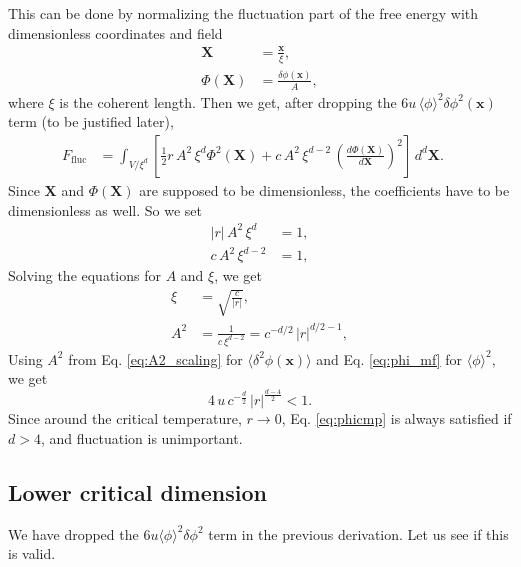 \documentclass{article}
\begin{document}
This can be done by normalizing the fluctuation part of the free energy with dimensionless coordinates and field
\begin{align}
\mathbf X &= \frac{ \mathbf x }{ \xi }, \\
\Phi(\mathbf X) &= \frac{ \delta \phi(\mathbf x) }{A},
\end{align}
where $\xi$ is the coherent length.
%
Then we get, after dropping the
$6 u \, \langle \phi \rangle^2 \delta \phi^2(\mathbf x)$ term
(to be justified later),
\begin{align}
F_\mathrm{fluc}
&=
\int_{V/\xi^d} \left[
\tfrac{1}{2} r \, A^2\, \xi^d \Phi^2(\mathbf X)
+ c \, A^2 \, \xi^{d-2} \, \left(
\frac{ d \Phi(\mathbf X) }{ d \mathbf X} \right)^2
\right] \, d^d \mathbf X. \quad
\label{eq:F_fluc}
\end{align}
Since $\mathbf X$ and $\Phi(\mathbf X)$ are supposed to be dimensionless,
the coefficients have to be dimensionless as well.  So we set
\begin{align}
|r| \, A^2 \, \xi^d &= 1, \\
c \, A^2 \, \xi^{d-2} &= 1,
\end{align}
Solving the equations for $A$ and $\xi$, we get
\begin{align}
\xi &= \sqrt{\frac{c}{|r|}},
\label{eq:xi_scaling}
\\
A^2 &= \frac{1}{c \, \xi^{d-2}} = c^{-d/2} \, |r|^{d/2-1},
\label{eq:A2_scaling}
\end{align}
Using $A^2$ from Eq. \eqref{eq:A2_scaling} for $\langle \delta^2 \phi(\mathbf x) \rangle$
and Eq. \eqref{eq:phi_mf} for $\langle \phi \rangle^2$, we get
$$
4 \, u \, c^{-\frac{d}{2}} \, |r|^{\frac{d-4}{2}} < 1.
$$
Since around the critical temperature, $r \rightarrow 0$,
Eq. \eqref{eq:phicmp} is always satisfied if $d > 4$,
and fluctuation is unimportant.


\subsection{Lower critical dimension}


We have dropped the $6u \langle \phi\rangle^2 \delta\phi^2$ term
in the previous derivation.
Let us see if this is valid.
\end{document}
